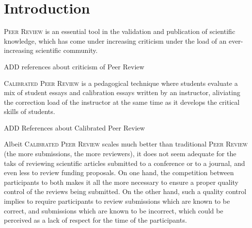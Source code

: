 \documentclass[usletter]{llncs}
\begin{document}
\section{Introduction}
%
\textsc{Peer Review} is an essential tool in the validation and publication of scientific knowledge, which has come under increasing criticism under the load of an ever-increasing scientific community.  
\begin{TODO}
ADD references about criticism of Peer Review
\end{TODO}

\textsc{Calibrated Peer Review} is a pedagogical technique where students evaluate a mix of student essays and calibration essays written by an instructor, aliviating the correction load of the instructor at the same time as it develops the critical skills of students. 

\begin{TODO}
ADD References about Calibrated Peer Review
\end{TODO}

Albeit \textsc{Calibrated Peer Review} scales much better than traditional \textsc{Peer Review} (the more submissions, the more reviewers), it does not seem adequate for the taks of reviewing scientific articles submitted to a conference or to a journal, and even less to review funding proposals. On one hand, the competition between participants to both makes it all the more necessary to ensure a proper quality control of the reviews being submitted. On the other hand, such a quality control implies to require participants to review submissions which are known to be correct, and submissions which are known to be incorrect, which could be perceived as a lack of respect for the time of the participants.
\end{document}

